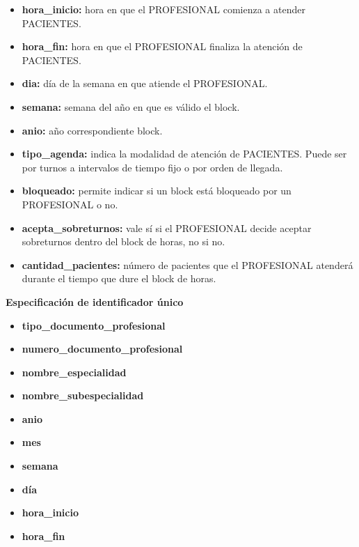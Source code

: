 \documentclass[a4paper,11pt]{article}
\begin{document}
\begin{itemize}


     \item \textbf{hora\_inicio:} hora en que el PROFESIONAL comienza a atender PACIENTES.

     \item \textbf{hora\_fin:} hora en que el PROFESIONAL finaliza la atención de PACIENTES.

     \item \textbf{dia:} día de la semana en que atiende el PROFESIONAL.

     \item \textbf{semana:} semana del año en que es válido el block.

	 \item \textbf{anio:} año correspondiente block.
	 
     \item \textbf{tipo\_agenda:} indica la modalidad de atención de PACIENTES. Puede ser por 
     turnos a intervalos de tiempo fijo o por orden de llegada.

     \item \textbf{bloqueado:} permite indicar si un block está bloqueado por un PROFESIONAL o no.

     \item \textbf{acepta\_sobreturnos:} vale sí si el PROFESIONAL decide aceptar sobreturnos dentro 
     del block de horas, no si no.

     \item \textbf{cantidad\_pacientes:} número de pacientes que el PROFESIONAL atenderá durante el tiempo que dure el block de horas.

\end{itemize}

\textbf{Especificación de identificador único}

\begin{itemize}
	\item \textbf{tipo\_documento\_profesional}
	\item \textbf{numero\_documento\_profesional}
	\item \textbf{nombre\_especialidad}
	\item \textbf{nombre\_subespecialidad}
	\item \textbf{anio}
	\item \textbf{mes}
	\item \textbf{semana}
	\item \textbf{día}
	\item \textbf{hora\_inicio}
	\item \textbf{hora\_fin}
   

\end{itemize}
\end{document}
